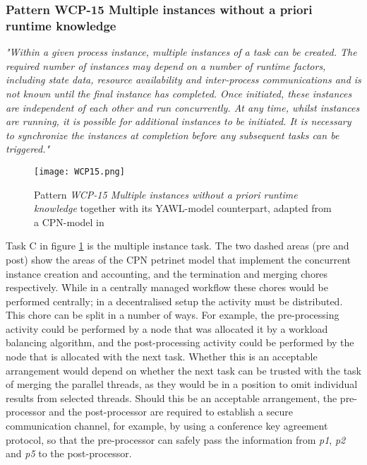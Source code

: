 \subsubsection{Pattern WCP-15 Multiple instances without a priori runtime knowledge}

\emph{"Within a given process instance, multiple instances of a task can be created. The required number of instances may depend on a number of runtime factors, including state data, resource availability and inter-process communications and is not known until the final instance has completed. Once initiated, these instances are independent of each other and run concurrently. At any time, whilst instances are running, it is possible for additional instances to be initiated. It is necessary to synchronize the instances at completion before any subsequent tasks can be triggered."} \cite{Russell2007}

\begin{figure}[htbp]
\begin{center}
\texttt{[image: WCP15.png]}
\caption{Pattern \emph{WCP-15 Multiple instances without a priori runtime knowledge} together with its YAWL-model counterpart, adapted from a CPN-model in \cite{Russell2007}}
\label{fig:wcp15}
\end{center}
\end{figure}

Task C in figure \ref{fig:wcp15} is the multiple instance task. The two dashed areas (pre and post) show the areas of the CPN petrinet model that implement the concurrent instance creation and accounting, and the termination and merging chores respectively. While in a centrally managed workflow these chores would be performed centrally; in a decentralised setup the activity must be distributed. This chore can be split in a number of ways. For example, the pre-processing activity could be performed by a node that was allocated it by a workload balancing algorithm, and the post-processing activity could be performed by the node that is allocated with the next task. Whether this is an acceptable arrangement would depend on whether the next task can be trusted with the task of merging the parallel threads, as they would be in a position to omit individual results from selected threads. Should this be an acceptable arrangement, the pre-processor and the post-processor are required to establish a secure communication channel, for example, by using a conference key agreement protocol, so that the pre-processor can safely pass the information from \emph{p1}, \emph{p2} and \emph{p5} to the post-processor.


